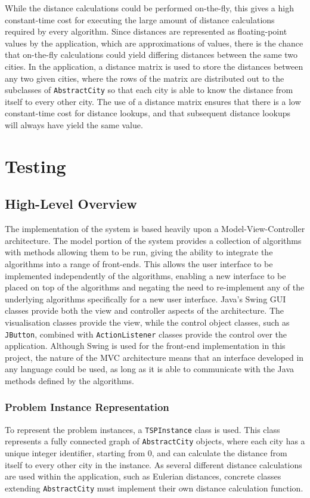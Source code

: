 \documentclass{l4proj}
\begin{document}
While the distance calculations could be performed on-the-fly, this gives a high constant-time cost for executing the large amount 
of distance calculations required by every algorithm. Since distances are represented as floating-point values by the application, 
which are approximations of values, there is the chance that on-the-fly calculations could yield differing distances between the same 
two cities. In the application, a distance matrix is used to store the distances between any two given cities, where the rows of the 
matrix are distributed out to the subclasses of \texttt{AbstractCity} so that each city is able to know the distance from itself to 
every other city. The use of a distance matrix ensures that there is a low constant-time cost for distance lookups, and that subsequent 
distance lookups will always have yield the same value.


\chapter{Testing}
\label{testing}

\section{High-Level Overview}
The implementation of the system is based heavily upon a Model-View-Controller architecture. The model portion of the system provides 
a collection of algorithms with methods allowing them to be run, giving the ability to integrate the algorithms into a range of front-ends. 
This allows the user interface to be implemented independently of the algorithms, enabling a new interface to be placed on top of the algorithms 
and negating the need to re-implement any of the underlying algorithms specifically for a new user interface. Java's Swing GUI classes 
provide both the view and controller aspects of the architecture. The visualisation classes provide the view, while the control object classes, 
such as \texttt{JButton}, combined with \texttt{ActionListener} classes provide the control over the application. Although Swing is used for 
the front-end implementation in this project, the nature of the MVC architecture means that an interface developed in any language could be 
used, as long as it is able to communicate with the Java methods defined by the algorithms.

\subsection{Problem Instance Representation}
To represent the problem instances, a \texttt{TSPInstance} class is used. This class represents a fully connected graph 
of \texttt{AbstractCity} objects, where each city has a unique integer identifier, starting from 0, and can calculate the 
distance from itself to every other city in the instance. As several different distance calculations are used within the 
application, such as Eulerian distances, concrete classes extending \texttt{AbstractCity} must implement their own distance calculation function.
\end{document}
